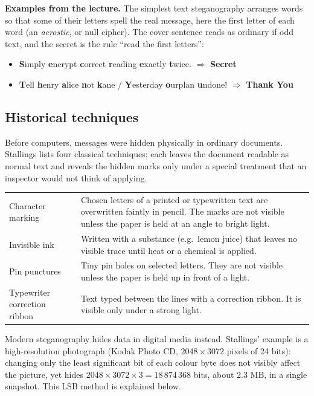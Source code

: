 \textbf{Examples from the lecture.} The simplest text steganography arranges words so that some of their letters spell the real message, here the first letter of each word (an \emph{acrostic}, or null cipher). The cover sentence reads as ordinary if odd text, and the secret is the rule ``read the first letters'':
\begin{itemize}
  \item \textbf{S}imply \textbf{e}ncrypt \textbf{c}orrect \textbf{r}eading \textbf{e}xactly \textbf{t}wice. $\Rightarrow$ \textbf{Secret}
  \item \textbf{T}ell \textbf{h}enry \textbf{a}lice \textbf{n}ot \textbf{k}ane / \textbf{Y}esterday \textbf{o}urplan \textbf{u}ndone! $\Rightarrow$ \textbf{Thank You}
\end{itemize}

\subsection{Historical techniques}
Before computers, messages were hidden physically in ordinary documents. Stallings lists four classical techniques; each leaves the document readable as normal text and reveals the hidden marks only under a special treatment that an inspector would not think of applying.
\begin{center}\small
\begin{tabularx}{\textwidth}{@{}l X@{}}
\toprule
Character marking & Chosen letters of a printed or typewritten text are overwritten faintly in pencil. The marks are not visible unless the paper is held at an angle to bright light.\\
Invisible ink & Written with a substance (e.g.\ lemon juice) that leaves no visible trace until heat or a chemical is applied.\\
Pin punctures & Tiny pin holes on selected letters. They are not visible unless the paper is held up in front of a light.\\
Typewriter correction ribbon & Text typed between the lines with a correction ribbon. It is visible only under a strong light.\\
\bottomrule
\end{tabularx}
\end{center}
Modern steganography hides data in digital media instead. Stallings' example is a high-resolution photograph (Kodak Photo CD, $2048 \times 3072$ pixels of 24 bits): changing only the least significant bit of each colour byte does not visibly affect the picture, yet hides $2048 \times 3072 \times 3 = 18\,874\,368$ bits, about 2.3 MB, in a single snapshot. This LSB method is explained below.

